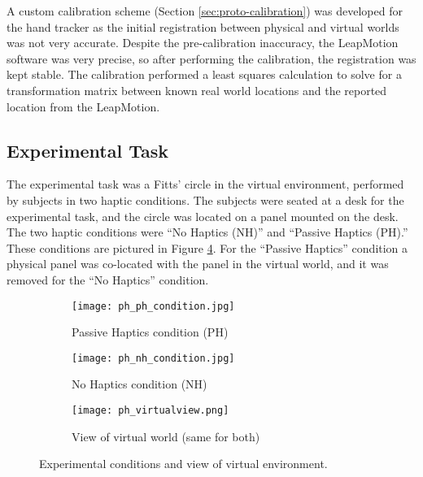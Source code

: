 A custom calibration scheme (Section \ref{sec:proto-calibration}) was developed for the hand tracker as the initial registration between physical and virtual worlds was not very accurate.
Despite the pre-calibration inaccuracy, the LeapMotion software was very precise, so after performing the calibration, the registration was kept stable.
The calibration performed a least squares calculation to solve for a transformation matrix between known real world locations and the reported location from the LeapMotion.

\subsection{Experimental Task}

The experimental task was a Fitts' circle in the virtual environment, performed by subjects in two haptic conditions.
The subjects were seated at a desk for the experimental task, and the circle was located on a panel mounted on the desk.
The two haptic conditions were ``No Haptics (NH)'' and ``Passive Haptics (PH).''
These conditions are pictured in Figure \ref{fig:ph_conditions}.
For the ``Passive Haptics'' condition a physical panel was co-located with the panel in the virtual world, and it was removed for the ``No Haptics'' condition.

\mbox{}\hfill
\begin{figure}
    \centering
    \begin{subfigure}[t]{0.3\linewidth}
        \centering
        \texttt{[image: ph\_ph\_condition.jpg]}
        \caption{Passive Haptics condition (PH)}
        \label{fig:ph_conditions:ph_condition}
    \end{subfigure}\hfill
    \begin{subfigure}[t]{0.3\linewidth}
        \centering
        \texttt{[image: ph\_nh\_condition.jpg]}
        \caption{No Haptics condition (NH)}
        \label{fig:ph_conditions:nh_condition}
    \end{subfigure}\hfill
    \begin{subfigure}[t]{0.3\linewidth}
        \centering
        \texttt{[image: ph\_virtualview.png]}
        \caption{View of virtual world (same for both)}
        \label{fig:ph_conditions:virtual}
    \end{subfigure}
    \caption{Experimental conditions and view of virtual environment.}
    \label{fig:ph_conditions}
\end{figure}
\hfill\mbox{}

